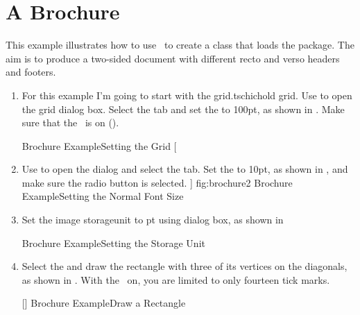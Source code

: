\section{A Brochure}\label{sec:brochure}

This example illustrates how to use \FlowframTk\ to create a
class that loads the  package. The aim is to
produce a two-sided document with different \gls{recto} and
\gls{verso} headers and footers.

\begin{enumerate}
\item For this example I'm going to start with the
\gls{grid.tschichold} grid.  Use  to
open the \gls{grid} dialog box. Select the 
tab and set the  to 100\gls{pt}, as shown in
. Make sure that the \gridlock\ is on
().

{}
{Brochure Example\dash Setting the Grid}
[
    \item Use  to open the
 dialog and select the
 tab. Set the
 to 10\gls{pt}, as shown in
, and make sure the
 radio button is selected.
]
{fig:brochure2}
{}
{Brochure Example\dash Setting the Normal Font Size}

\item Set the image \gls{storageunit} to \gls{pt} using
 dialog box, as shown in

{}
{Brochure Example\dash Setting the Storage Unit}

\item Select the  and draw the rectangle
with three of its vertices on the diagonals, as shown in
. With the \gridlock\ on, you are limited to
only fourteen tick marks.

[]
{}
{Brochure Example\dash Draw a Rectangle}


\end{enumerate}
